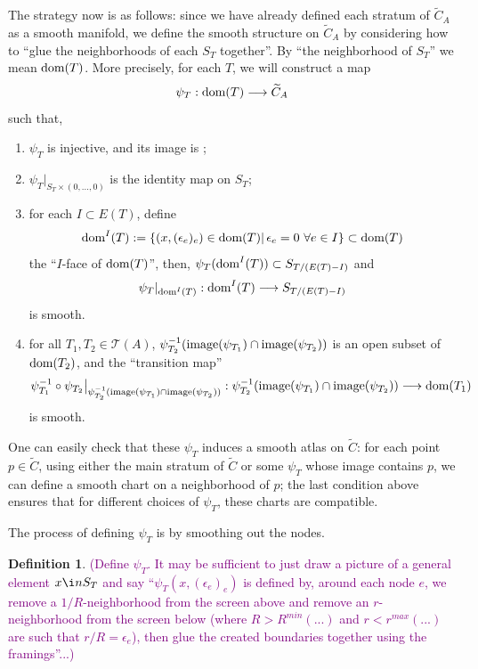 \documentclass[11pt]{article}
\theoremstyle{definition}
\newtheorem{dfn}[thm]{Definition}
\theoremstyle{remark}
\def\wt#1{\widetilde{#1}}
\def\cT{\mathcal{T}}
\def\dom{{\tn{dom}}}
\def\cmt#1{\textcolor{purple}{(#1)}}
\def\tn#1{\textnormal{#1}}
\begin{document}
The strategy now is as follows: since we have already defined each stratum of $\wt{C}_A$ as a smooth manifold, we define the smooth structure on $\wt{C}_A$ by considering how to ``glue the neighborhoods of each $S_T$ together''. 
By ``the neighborhood of $S_T$'' we mean $\dom(T)$. 
More precisely, for each $T$, we will construct a map 
$$\psi_T:\dom(T)\longrightarrow \widetilde{C}_A$$
such that, 
\begin{enumerate}
\item \label{psi1_item} $\psi_T$ is injective, and its image is ;

\item \label{psi2_item} $\psi_T|_{S_T\times(0,\ldots,0)}$ is the identity map on $S_T$; 

\item \label{psi3_item} for each $I\subset E(T)$, define 
$$\dom^I(T):=\{(x,(\epsilon_e)_e)\in\dom(T) |\,\epsilon_e=0\  \forall e\in I\}\subset \dom(T)$$
the ``$I$-face of $\dom(T)$'',  then, 
$\psi_T(\dom^I(T))\subset S_{T/(E(T)-I)}$
and 
$$\psi_T|_{\dom^I(T)}:\dom^I(T)\longrightarrow S_{T/(E(T)-I)}$$
is smooth. 

\item \label{psi4_item} for all $T_1,T_2\in\cT(A)$, $\psi_{T_2}^{-1}(\tn{image}(\psi_{T_1})\cap\tn{image}(\psi_{T_2}))$ is an open subset of $\dom(T_2)$, and the ``transition map'' 
$$\psi_{T_1}^{-1}\circ\psi_{T_2}\big|_{\psi_{T_2}^{-1}(\tn{image}(\psi_{T_1})\cap\tn{image}(\psi_{T_2}))}:\psi_{T_2}^{-1}(\tn{image}(\psi_{T_1})\cap\tn{image}(\psi_{T_2}))\longrightarrow \dom(T_1)$$
is smooth. 
\end{enumerate}
  
One can easily check that these $\psi_T$ induces a smooth atlas on $\wt{C}$: for each point $p\in\wt{C}$, using either the main stratum of $\wt{C}$ or some $\psi_T$ whose image contains $p$, we can define a smooth chart on a neighborhood of $p$; the last condition above ensures that for different choices of $\psi_T$, these charts are compatible. 

The process of defining $\psi_T$ is by smoothing out the nodes. 

\begin{dfn}
\cmt{Define $\psi_T$. It may be sufficient to just draw a picture of a general element $x\i nS_T$ and say ``$\psi_T(x,(\epsilon_e)_e)$ is defined by, around each node $e$, we remove a $1/R$-neighborhood from the screen above and remove an $r$-neighborhood from the screen below (where $R>R^{min}(...)$ and $r<r^{max}(...)$ are such that $r/R=\epsilon_e$), then glue the created boundaries together using the framings''...}
\end{dfn}
\end{document}
